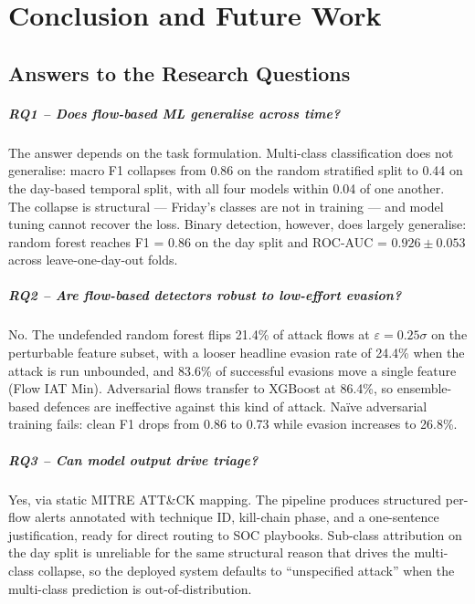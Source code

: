 \chapter{Conclusion and Future Work}
\label{ch:conclusion}

\section{Answers to the Research Questions}

\paragraph{RQ1 -- Does flow-based ML generalise across time?}
The answer depends on the task formulation. Multi-class classification
does not generalise: macro F1 collapses from 0.86 on the random
stratified split to 0.44 on the day-based temporal split, with all four
models within 0.04 of one another. The collapse is structural --- Friday's
classes are not in training --- and model tuning cannot recover the loss.
Binary detection, however, does largely generalise: random forest reaches
F1 = 0.86 on the day split and ROC-AUC = $0.926 \pm 0.053$ across
leave-one-day-out folds.

\paragraph{RQ2 -- Are flow-based detectors robust to low-effort evasion?}
No. The undefended random forest flips 21.4\% of attack flows at
$\varepsilon = 0.25\sigma$ on the perturbable feature subset, with a
looser headline evasion rate of 24.4\% when the attack is run unbounded,
and 83.6\% of successful evasions move a single feature (Flow IAT Min).
Adversarial flows transfer to XGBoost at 86.4\%, so ensemble-based
defences are ineffective against this kind of attack. Naïve adversarial
training fails: clean F1 drops from 0.86 to 0.73 while evasion increases
to 26.8\%.

\paragraph{RQ3 -- Can model output drive triage?}
Yes, via static MITRE ATT\&CK mapping. The pipeline produces structured
per-flow alerts annotated with technique ID, kill-chain phase, and a
one-sentence justification, ready for direct routing to SOC playbooks.
Sub-class attribution on the day split is unreliable for the same
structural reason that drives the multi-class collapse, so the deployed
system defaults to ``unspecified attack'' when the multi-class prediction
is out-of-distribution.

